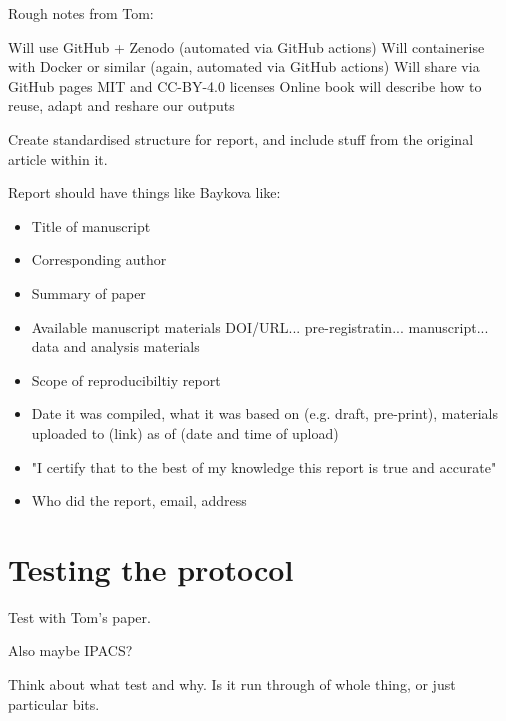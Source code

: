 Rough notes from Tom:

Will use GitHub + Zenodo (automated via GitHub actions)
Will containerise with Docker or similar (again, automated via GitHub actions)
Will share via GitHub pages
MIT and CC-BY-4.0 licenses
Online book will describe how to reuse, adapt and reshare our outputs

Create standardised structure for report, and include stuff from the original article within it.

Report should have things like Baykova \autocite{baykova_ensuring_2024} like:
\begin{itemize}
    \item Title of manuscript
    \item Corresponding author
    \item Summary of paper
    \item Available manuscript materials DOI/URL... pre-registratin... manuscript... data and analysis materials
    \item Scope of reproducibiltiy report
    \item Date it was compiled, what it was based on (e.g. draft, pre-print), materials uploaded to (link) as of (date and time of upload)
    \item "I certify that to the best of my knowledge this report is true and accurate"
    \item Who did the report, email, address
\end{itemize}

\section{Testing the protocol}

Test with Tom's paper.

Also maybe IPACS?

Think about what test and why. Is it run through of whole thing, or just particular bits.
